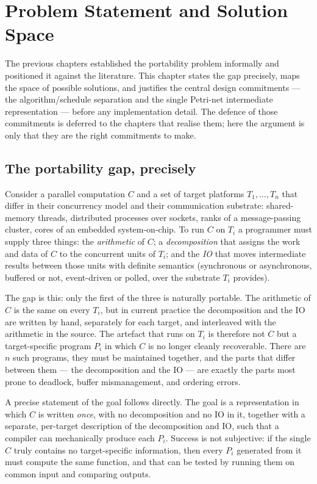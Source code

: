 \chapter{Problem Statement and Solution Space}\label{ch:problem}

The previous chapters established the portability problem informally and
positioned it against the literature. This chapter states the gap precisely,
maps the space of possible solutions, and justifies the central design
commitments --- the algorithm/schedule separation and the single Petri-net
intermediate representation --- before any implementation detail. The defence of
those commitments is deferred to the chapters that realise them; here the
argument is only that they are the right commitments to make.

\section{The portability gap, precisely}\label{sec:prob-gap}

Consider a parallel computation $C$ and a set of target platforms
$T_1,\dots,T_n$ that differ in their concurrency model and their communication
substrate: shared-memory threads, distributed processes over sockets, ranks of a
message-passing cluster, cores of an embedded system-on-chip. To run $C$ on
$T_i$ a programmer must supply three things: the \emph{arithmetic} of $C$; a
\emph{decomposition} that assigns the work and data of $C$ to the concurrent
units of $T_i$; and the \emph{IO} that moves intermediate results between those
units with definite semantics (synchronous or asynchronous, buffered or not,
event-driven or polled, over the substrate $T_i$ provides).

The gap is this: only the first of the three is naturally portable. The
arithmetic of $C$ is the same on every $T_i$, but in current practice the
decomposition and the IO are written by hand, separately for each target, and
interleaved with the arithmetic in the source. The artefact that runs on $T_i$
is therefore not $C$ but a target-specific program $P_i$ in which $C$ is no
longer cleanly recoverable. There are $n$ such programs, they must be maintained
together, and the parts that differ between them --- the decomposition and the IO
--- are exactly the parts most prone to deadlock, buffer mismanagement, and
ordering errors.

A precise statement of the goal follows directly. The goal is a representation in
which $C$ is written \emph{once}, with no decomposition and no IO in it, together
with a separate, per-target description of the decomposition and IO, such that a
compiler can mechanically produce each $P_i$. Success is not subjective: if the
single $C$ truly contains no target-specific information, then every $P_i$
generated from it must compute the same function, and that can be tested by
running them on common input and comparing outputs.

